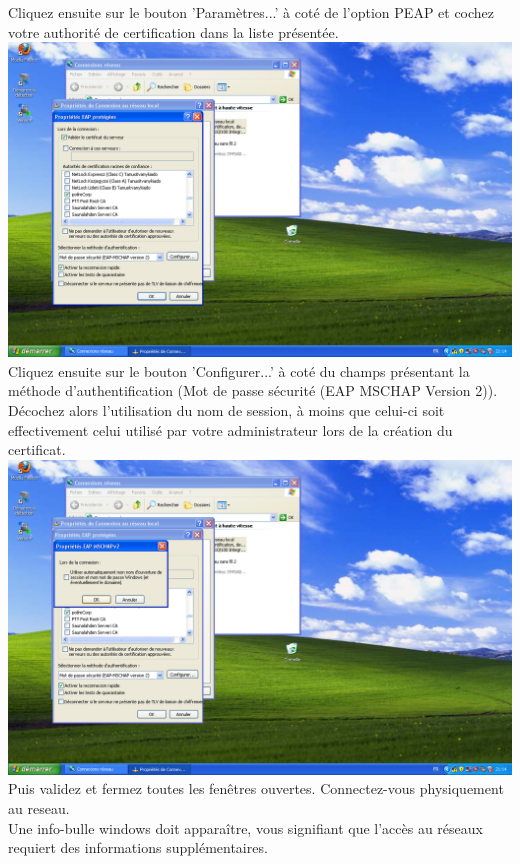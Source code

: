 Cliquez ensuite sur le bouton 'Paramètres...' à coté de l'option PEAP et cochez votre authorité de certification dans la liste présentée.\\
\includegraphics[width=\screenShotSize{}]{imgUser/peapParams.PNG}\\
Cliquez ensuite sur le bouton 'Configurer...' à coté du champs présentant la méthode d'authentification (Mot de passe sécurité (EAP MSCHAP Version 2)).\\
Décochez alors l'utilisation du nom de session, à moins que celui-ci soit effectivement celui utilisé par votre administrateur lors de la création du certificat.\\
\includegraphics[width=\screenShotSize{}]{imgUser/peapParamsConfig.PNG}\\
Puis validez et fermez toutes les fenêtres ouvertes.
Connectez-vous physiquement au reseau.\\
Une info-bulle windows doit apparaître, vous signifiant que l'accès au réseaux requiert des informations supplémentaires.\\
